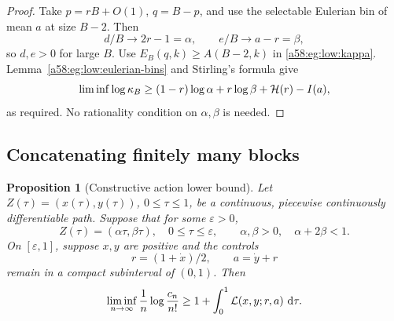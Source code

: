 \documentclass[11pt,letterpaper]{article}
\newtheorem{proposition}[theorem]{Proposition}
\theoremstyle{remark}
\newcommand{\egdd}{\,\mathrm d}
\begin{document}
\begin{proof}
Take \(p=rB+O(1)\), \(q=B-p\), and use the selectable Eulerian bin
of mean \(a\) at size \(B-2\). Then
\[
 d/B\to 2r-1=\alpha,\qquad e/B\to a-r=\beta,
\]
so \(d,e>0\) for large \(B\).
Use \(E_B(q,k)\ge A(B-2,k)\) in \eqref{a58:eg:low:kappa}.
Lemma~\ref{a58:eg:low:eulerian-bins} and Stirling's formula give
\[
 \liminf\log\kappa_B
 \ge (1-r)\log\alpha+r\log\beta+{\cal H}(r)-I(a),
\]
as required. No rationality condition on \(\alpha,\beta\) is needed.
\end{proof}

\subsection{Concatenating finitely many blocks}

\begin{proposition}[Constructive action lower bound]\label{a58:eg:low:action-bound}
Let \(Z(\tau)=(x(\tau),y(\tau))\), \(0\le\tau\le1\), be a
continuous, piecewise continuously differentiable path.
Suppose that for some \(\varepsilon>0\),
\[
 Z(\tau)=(\alpha\tau,\beta\tau),\quad 0\le\tau\le\varepsilon,
 \qquad
 \alpha,\beta>0,\quad \alpha+2\beta<1.
\]
On \([\varepsilon,1]\), suppose \(x,y\) are positive and the
controls
\[
 r=(1+\dot x)/2,\qquad a=\dot y+r
\]
remain in a compact subinterval of \((0,1)\).
Then
\begin{equation}\label{a58:eg:low:action-ineq}
 \liminf_{n\to\infty}\frac1n\log\frac{c_n}{n!}
 \ge 1+\int_0^1{\cal L}(x,y;r,a)\,\egdd\tau.
\end{equation}
\end{proposition}
\end{document}
